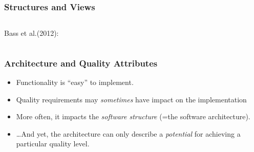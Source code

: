 \documentclass[10pt]{beamer}
\begin{document}
\begin{frame}[t]
\frametitle{Structures and Views}

\begin{columns}%
\column{7cm}%
Bass et al.(2012):

\qtreecenterfalse%
\begin{scriptsize}%
\vspace{0.5cm}
\vspace{0.5cm}
\end{scriptsize}%

\column{5cm}%

\end{columns}
\end{frame}


\begin{frame}[t]
\frametitle{Architecture and Quality Attributes}
\begin{itemize}
\item Functionality is ``easy'' to implement.
\item Quality requirements may \emph{sometimes} have impact on the implementation
\item More often, it impacts the \emph{software structure} (=the software architecture).
\item \ldots And yet, the architecture can only describe a \emph{potential} for achieving a particular quality level.
\end{itemize}
\end{frame}
\end{document}
